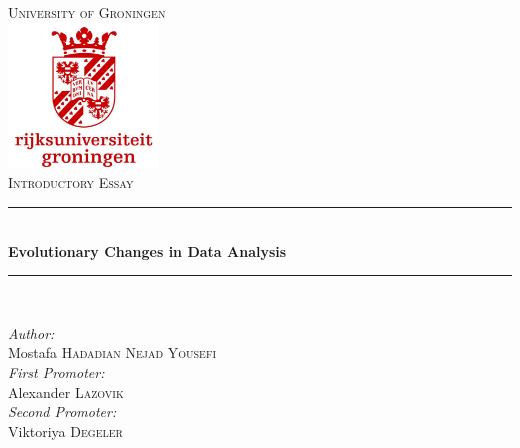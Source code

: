 \documentclass{article}
\begin{document}
\begin{titlepage}

\newcommand{\HRule}{\rule{\linewidth}{0.5mm}} %

\center %
 

\textsc{\LARGE University of Groningen}\\[1.5cm] %
\includegraphics[width=150px, keepaspectratio]{rug.png}\\[1cm] %
\textsc{\Large Introductory Essay}\\[0.5cm] %


\HRule \\[0.4cm]
{ \huge \bfseries Evolutionary Changes in Data Analysis}\\[0.4cm] %
\HRule \\[1.5cm]
 

\begin{minipage}{0.5\textwidth}
    \begin{center} \large
        \emph{Author:}\\
        Mostafa \textsc{Hadadian Nejad Yousefi}\\ %
        \bigskip \bigskip
        \emph{First Promoter:}\\
        Alexander \textsc{Lazovik}\\ %
        \bigskip \bigskip
        \emph{Second Promoter:}\\
        Viktoriya \textsc{Degeler}\\ %
    \end{center}
\end{minipage}\\[2cm]




\end{titlepage}
\end{document}
